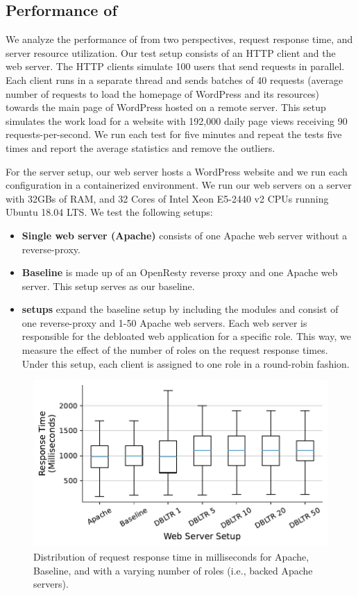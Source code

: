 \subsection{Performance of \dbltr{}}

We analyze the performance of \dbltr{} from two perspectives, request response time, and server resource utilization. 
Our test setup consists of an HTTP client and the web server. 
The HTTP clients simulate 100 users that send requests in parallel. 
Each client runs in a separate thread and sends batches of 40 requests (average number of requests to load the homepage of WordPress and its resources) towards the main page of WordPress hosted on a remote server. 
This setup simulates the work load for a website with 192,000 daily page views receiving 90 requests-per-second. 
We run each test for five minutes and repeat the tests five times and report the average statistics and remove the outliers. 

For the server setup, our web server hosts a WordPress website and we run each configuration in a containerized environment. 
We run our web servers on a server with 32GBs of RAM, and 32 Cores of Intel Xeon E5-2440 v2 CPUs running Ubuntu 18.04 LTS. 
We test the following setups:

\begin{itemize}
    \item \textbf{Single web server (Apache)} consists of one Apache web server without a reverse-proxy. 
    \item \textbf{Baseline} is made up of an OpenResty reverse proxy and one Apache web server. This setup serves as our baseline. 
    \item \textbf{\dbltr{} setups} expand the baseline setup by including the \dbltr{} modules and consist of one reverse-proxy and 1-50 Apache web servers. Each web server is responsible for the debloated web application for a specific role. This way, we measure the effect of the number of roles on the request response times. Under this setup, each client is assigned to one role in a round-robin fashion.
\end{itemize}

\begin{figure}[]
    \centering
    \includegraphics[width=0.8\linewidth]{figures/dbltr/performance.pdf}
    \caption{Distribution of request response time in milliseconds for Apache, Baseline, and \dbltr{} with a varying number of roles (i.e., backed Apache servers).}
    \label{fig:performance}
  \end{figure}

